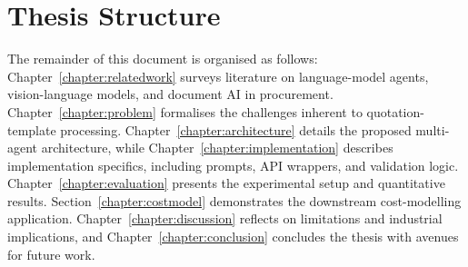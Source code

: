 \section{Thesis Structure }
The remainder of this document is organised as follows:  
Chapter~\ref{chapter:relatedwork} surveys literature on language-model agents, vision-language models, and document AI in procurement.  
Chapter~\ref{chapter:problem} formalises the challenges inherent to quotation-template processing.  
Chapter~\ref{chapter:architecture} details the proposed multi-agent architecture, while Chapter~\ref{chapter:implementation} describes implementation specifics, including prompts, API wrappers, and validation logic.  
Chapter~\ref{chapter:evaluation} presents the experimental setup and quantitative results.  
Section~\ref{chapter:costmodel} demonstrates the downstream cost-modelling application.  
Chapter~\ref{chapter:discussion} reflects on limitations and industrial implications, and Chapter~\ref{chapter:conclusion} concludes the thesis with avenues for future work.
